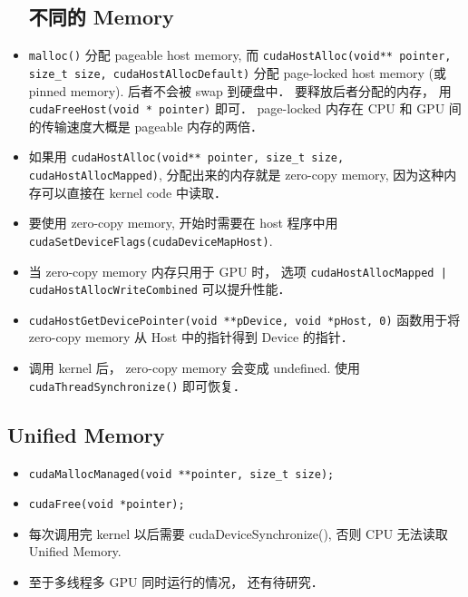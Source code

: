 \begin{itemize}
\subsection{不同的 Memory}
\item \verb`malloc()` 分配 pageable host memory, 而 \verb`cudaHostAlloc(void** pointer, size_t size, cudaHostAllocDefault)` 分配 page-locked host memory (或 pinned memory). 后者不会被 swap 到硬盘中． 要释放后者分配的内存， 用 \verb`cudaFreeHost(void * pointer)` 即可． page-locked 内存在 CPU 和 GPU 间的传输速度大概是 pageable 内存的两倍．
\item 如果用 \verb`cudaHostAlloc(void** pointer, size_t size, cudaHostAllocMapped)`, 分配出来的内存就是 zero-copy memory, 因为这种内存可以直接在 kernel code 中读取．
\item 要使用 zero-copy memory, 开始时需要在 host 程序中用 \verb`cudaSetDeviceFlags(cudaDeviceMapHost)`.
\item 当 zero-copy memory 内存只用于 GPU 时， 选项 \verb`cudaHostAllocMapped | cudaHostAllocWriteCombined` 可以提升性能．
\item \verb`cudaHostGetDevicePointer(void **pDevice, void *pHost, 0)` 函数用于将 zero-copy memory 从 Host 中的指针得到 Device 的指针．
\item 调用 kernel 后， zero-copy memory 会变成 undefined. 使用 \verb`cudaThreadSynchronize()` 即可恢复．
\end{itemize}

\subsection{Unified Memory}
\begin{itemize}
\item \verb|cudaMallocManaged(void **pointer, size_t size);|
\item \verb|cudaFree(void *pointer);|
\item 每次调用完 kernel 以后需要 cudaDeviceSynchronize(), 否则 CPU 无法读取 Unified Memory.
\item 至于多线程多 GPU 同时运行的情况， 还有待研究．
\end{itemize}

